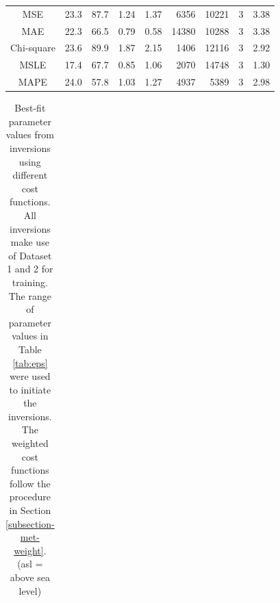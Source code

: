 \documentclass[a4paper,fleqn]{cas-sc}
\begin{document}
\begin{table}[]
\begin{tabular}{crrrrrrrr}
MSE   & 23.3    & 87.7    & 1.24    & 1.37   & 6356  & 10221   & 3  & 3.38     \\
MAE  & 22.3   & 66.5  & 0.79     & 0.58   & 14380  & 10288    & 3    & 3.38    \\
Chi-square    & 23.6   & 89.9  & 1.87   & 2.15  & 1406   & 12116  & 3  & 2.92  \\ 
MSLE   & 17.4   & 67.7   & 0.85   & 1.06   & 2070   & 14748  & 3   & 1.30   \\
MAPE   & 24.0  & 57.8   & 1.03    & 1.27    & 4937    & 5389   & 3  & 2.98  \\ \hline
\end{tabular}
\end{table}

\begin{table}[]
\caption{Best-fit parameter values from inversions using different cost functions. All inversions make use of Dataset 1 and 2 for training. The range of parameter values in Table \ref{tab:eps} were used to initiate the inversions. The weighted cost functions follow the procedure in Section \ref{subsection-met-weight}. (asl = above sea level)}
\label{tab:esps_wt}
\begin{tabular}{crrrrrrrr}
\hline

\end{tabular}
\end{table}
\end{document}
